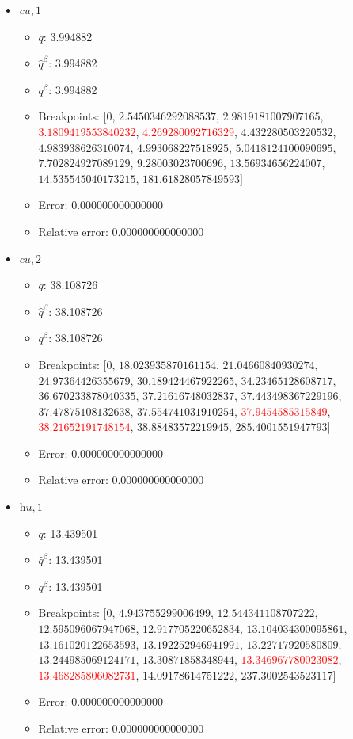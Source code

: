 \documentclass{article}%
\begin{document}
\begin{itemize}
\begin{itemize}
		\item Error: 0.000000000000000%
		\item Relative error: 0.000000000000000%
	\end{itemize}%
	\item $\textit{cu},1$%
	\begin{itemize}%
		\item $q$: 3.994882%
		\item $\hat{q}^\beta$: 3.994882%
		\item $q^\beta$: 3.994882%
		\item Breakpoints: $[$$0$, $2.5450346292088537$, $2.9819181007907165$, \textcolor{red}{$3.1809419553840232$}, \textcolor{red}{$4.269280092716329$}, $4.432280503220532$, $4.983938626310074$, $4.993068227518925$, $5.0418124100090695$, $7.702824927089129$, $9.28003023700696$, $13.56934656224007$, $14.535545040173215$, $181.61828057849593$$]$%
		\item Error: 0.000000000000000%
		\item Relative error: 0.000000000000000%
	\end{itemize}%
	\item $\textit{cu},2$%
	\begin{itemize}%
		\item $q$: 38.108726%
		\item $\hat{q}^\beta$: 38.108726%
		\item $q^\beta$: 38.108726%
		\item Breakpoints: $[$$0$, $18.023935870161154$, $21.04660840930274$, $24.97364426355679$, $30.189424467922265$, $34.23465128608717$, $36.670233878040335$, $37.21616748032837$, $37.443498367229196$, $37.47875108132638$, $37.554741031910254$, \textcolor{red}{$37.9454585315849$}, \textcolor{red}{$38.21652191748154$}, $38.88483572219945$, $285.4001551947793$$]$%
		\item Error: 0.000000000000000%
		\item Relative error: 0.000000000000000%
	\end{itemize}%
	\item $\textit{hu},1$%
	\begin{itemize}%
		\item $q$: 13.439501%
		\item $\hat{q}^\beta$: 13.439501%
		\item $q^\beta$: 13.439501%
		\item Breakpoints: $[$$0$, $4.943755299006499$, $12.544341108707222$, $12.595096067947068$, $12.917705220652834$, $13.104034300095861$, $13.161020122653593$, $13.192252946941991$, $13.22717920580809$, $13.244985069124171$, $13.30871858348944$, \textcolor{red}{$13.346967780023082$}, \textcolor{red}{$13.468285806082731$}, $14.09178614751222$, $237.3002543523117$$]$%
		\item Error: 0.000000000000000%
		\item Relative error: 0.000000000000000%
	\end{itemize}%
\end{itemize}%
\end{document}
